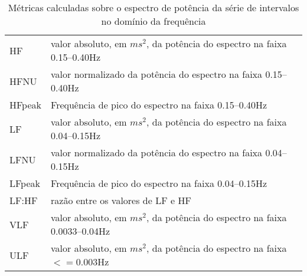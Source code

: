             \begin{table}[ht!]
                \centering
                \caption{Métricas calculadas sobre o espectro de potência da série de intervalos no domínio da frequência}
                \label{freqdomain}
                \begin{tabular}{l | p{8cm}}
                HF & valor absoluto, em $ms^2$, da potência do espectro na faixa 0.15–0.40Hz\\
                HFNU  & valor normalizado da potência do espectro na faixa 0.15–0.40Hz\\
                HFpeak & Frequência de pico do espectro na faixa 0.15–0.40Hz \\
                LF & valor absoluto, em $ms^2$, da potência do espectro na faixa 0.04–0.15Hz \\
                LFNU  & valor normalizado da potência do espectro na faixa 0.04–0.15Hz\\
                LFpeak & Frequência de pico do espectro na faixa 0.04–0.15Hz \\
                LF:HF & razão entre os valores de LF e HF \\
                VLF & valor absoluto, em $ms^2$, da potência do espectro na faixa 0.0033–0.04Hz \\
                ULF & valor absoluto, em $ms^2$, da potência do espectro na faixa $<= 0.003$Hz \\
                \end{tabular}
            \end{table}